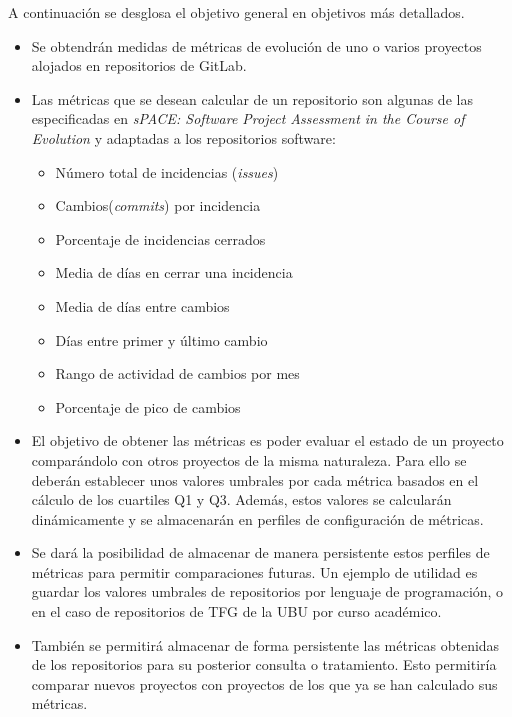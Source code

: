 A continuación se desglosa el objetivo general  en objetivos más detallados.
\begin{itemize}
	\tightlist
	\item Se obtendrán medidas de métricas de evolución de uno o varios proyectos alojados en repositorios de GitLab.
	\item Las métricas que se desean calcular de un repositorio  son algunas de las especificadas en \textit{sPACE: Software Project Assessment in the Course of Evolution} \cite{ratzinger_space:_2007} y 
	adaptadas a los repositorios software:
	\begin{itemize}
		\tightlist
		\item Número total de incidencias (\textit{issues})
		\item Cambios(\textit{commits}) por incidencia
		\item Porcentaje de incidencias cerrados
		\item Media de días en cerrar una incidencia
		\item Media de días entre cambios
		\item Días entre primer y último cambio
		\item Rango de actividad de cambios por mes
		\item Porcentaje de pico de cambios
	\end{itemize}
	\item El objetivo de obtener las métricas es poder evaluar el estado de un proyecto comparándolo con otros proyectos de la misma naturaleza. Para ello se deberán establecer unos valores umbrales por cada métrica basados en el cálculo de los cuartiles Q1 y Q3. Además, estos valores se calcularán dinámicamente y se almacenarán en perfiles de configuración de métricas.
	\item Se dará la posibilidad de almacenar de manera persistente estos perfiles de métricas para permitir comparaciones futuras. Un ejemplo de utilidad es guardar los valores umbrales de repositorios por lenguaje de programación, o en el caso de repositorios de TFG de la UBU por curso académico.
	\item También se permitirá almacenar de forma persistente las métricas obtenidas de los repositorios para su posterior consulta o tratamiento. Esto permitiría comparar nuevos proyectos con proyectos de los que ya se han calculado sus métricas.
\end{itemize}
